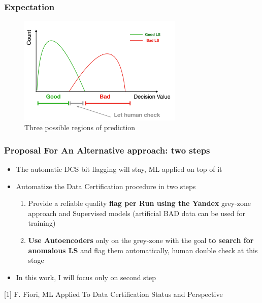 \documentclass{beamer}
\begin{document}

\begin{frame}
\frametitle{Expectation}
\begin{figure}
    \includegraphics[height=0.7\textheight, width=0.7\textwidth]{images/expected_greyzone}
    \caption{Three possible regions of prediction}
\end{figure}
\end{frame}


\begin{frame}
\frametitle{Proposal For An Alternative approach: two steps}
\begin{itemize}
    \item The automatic DCS bit flagging will stay, ML applied on top of it
    \item Automatize the Data Certification procedure in two steps
    \begin{enumerate}
        \item Provide a reliable quality \textbf{flag per Run using the Yandex} grey-zone approach and Supervised models (artificial BAD data can be used for training)
        \item \textbf{Use Autoencoders} only on the grey-zone with the goal \textbf{to search for anomalous LS} and flag them automatically, human double check at this stage
    \end{enumerate}
    \item In this work, I will focus only on second step
\end{itemize}
\vspace{0.4in}
\tiny [1] F. Fiori, ML Applied To Data Certification Status and Perspective
\end{frame}

\end{document}
